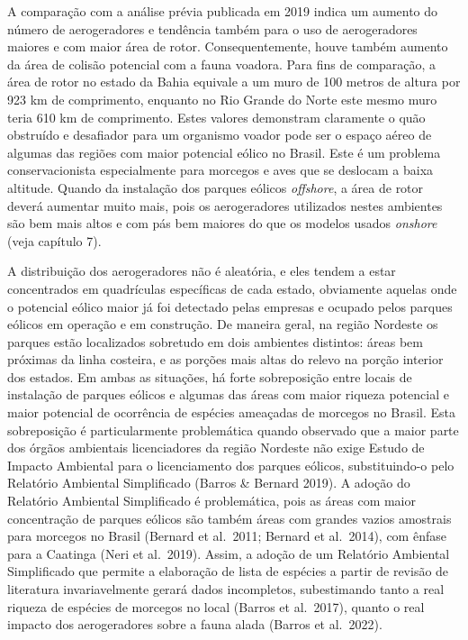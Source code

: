 \documentclass[
  oneside]{scrbook}
\begin{document}
A comparação com a análise prévia publicada em 2019 indica um aumento do número de aerogeradores e tendência também para o uso de aerogeradores maiores e com maior área de rotor. Consequentemente, houve também aumento da área de colisão potencial com a fauna voadora. Para fins de comparação, a área de rotor no estado da Bahia equivale a um muro de 100 metros de altura por 923 km de comprimento, enquanto no Rio Grande do Norte este mesmo muro teria 610 km de comprimento. Estes valores demonstram claramente o quão obstruído e desafiador para um organismo voador pode ser o espaço aéreo de algumas das regiões com maior potencial eólico no Brasil. Este é um problema conservacionista especialmente para morcegos e aves que se deslocam a baixa altitude. Quando da instalação dos parques eólicos \emph{offshore}, a área de rotor deverá aumentar muito mais, pois os aerogeradores utilizados nestes ambientes são bem mais altos e com pás bem maiores do que os modelos usados \emph{onshore} (veja capítulo 7).

A distribuição dos aerogeradores não é aleatória, e eles tendem a estar concentrados em quadrículas específicas de cada estado, obviamente aquelas onde o potencial eólico maior já foi detectado pelas empresas e ocupado pelos parques eólicos em operação e em construção. De maneira geral, na região Nordeste os parques estão localizados sobretudo em dois ambientes distintos: áreas bem próximas da linha costeira, e as porções mais altas do relevo na porção interior dos estados. Em ambas as situações, há forte sobreposição entre locais de instalação de parques eólicos e algumas das áreas com maior riqueza potencial e maior potencial de ocorrência de espécies ameaçadas de morcegos no Brasil. Esta sobreposição é particularmente problemática quando observado que a maior parte dos órgãos ambientais licenciadores da região Nordeste não exige Estudo de Impacto Ambiental para o licenciamento dos parques eólicos, substituindo-o pelo Relatório Ambiental Simplificado (Barros \& Bernard 2019). A adoção do Relatório Ambiental Simplificado é problemática, pois as áreas com maior concentração de parques eólicos são também áreas com grandes vazios amostrais para morcegos no Brasil (Bernard et al.~2011; Bernard et al.~2014), com ênfase para a Caatinga (Neri et al.~2019). Assim, a adoção de um Relatório Ambiental Simplificado que permite a elaboração de lista de espécies a partir de revisão de literatura invariavelmente gerará dados incompletos, subestimando tanto a real riqueza de espécies de morcegos no local (Barros et al.~2017), quanto o real impacto dos aerogeradores sobre a fauna alada (Barros et al.~2022).
\end{document}
